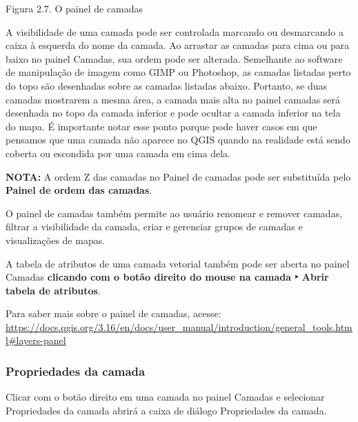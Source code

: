 \documentclass[
]{book}
\begin{document}
Figura 2.7. O painel de camadas

A visibilidade de uma camada pode ser controlada marcando ou desmarcando a caixa à esquerda do nome da camada. Ao arrastar as camadas para cima ou para baixo no painel Camadas, sua ordem pode ser alterada. Semelhante ao software de manipulação de imagem como GIMP ou Photoshop, as camadas listadas perto do topo são desenhadas sobre as camadas listadas abaixo. Portanto, se duas camadas mostrarem a mesma área, a camada mais alta no painel camadas será desenhada no topo da camada inferior e pode ocultar a camada inferior na tela do mapa. É importante notar esse ponto porque pode haver casos em que pensamos que uma camada não aparece no QGIS quando na realidade está sendo coberta ou escondida por uma camada em cima dela.

\textbf{NOTA:} A ordem Z das camadas no Painel de camadas pode ser substituída pelo \textbf{Painel de ordem das camadas}.

O painel de camadas também permite ao usuário renomear e remover camadas, filtrar a visibilidade da camada, criar e gerenciar grupos de camadas e visualizações de mapas.

A tabela de atributos de uma camada vetorial também pode ser aberta no painel Camadas \textbf{clicando com o botão direito do mouse na camada ‣ Abrir tabela de atributos}.

Para saber mais sobre o painel de camadas, acesse: \href{https://docs.qgis.org\%20/3.16/en/docs/user_manual/introduction/general_tools.html\#layers-panel}{https://docs.qgis.org/3.16/en/docs/user\_manual/introduction/general\_tools.html\#layers-panel}

\hypertarget{propriedades-da-camada}{%
\subsubsection{\texorpdfstring{\textbf{Propriedades da camada}}{Propriedades da camada}}\label{propriedades-da-camada}}

Clicar com o botão direito em uma camada no painel Camadas e selecionar Propriedades da camada abrirá a caixa de diálogo Propriedades da camada.
\end{document}
